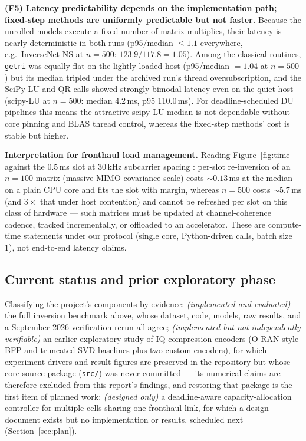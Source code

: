 \documentclass[11pt,a4paper]{article}
\begin{document}
\textbf{(F5) Latency predictability depends on the implementation path;
fixed-step methods are uniformly predictable but not faster.} Because the
unrolled models execute a fixed number of matrix multiplies, their latency is
nearly deterministic in both runs (p95/median $\le 1.1$ everywhere, e.g.\
InverseNet-NS at $n{=}500$: $123.9/117.8 = 1.05$). Among the classical
routines, \texttt{getri} was equally flat on the lightly loaded host
(p95/median $= 1.04$ at $n{=}500$) but its median tripled under the archived
run's thread oversubscription, and the SciPy LU and QR calls showed strongly
bimodal latency even on the quiet host (scipy-LU at $n{=}500$: median
4.2\,ms, p95 110.0\,ms). For deadline-scheduled DU pipelines this means the
attractive scipy-LU median is not dependable without core pinning and BLAS
thread control, whereas the fixed-step methods' cost is stable but higher.

\textbf{Interpretation for fronthaul load management.} Reading
Figure~\ref{fig:time} against the 0.5\,ms slot at 30\,kHz subcarrier spacing
\cite{ts38211}: per-slot re-inversion of an $n{=}100$ matrix
(massive-MIMO covariance scale) costs ${\sim}0.13$\,ms at the median on a
plain CPU core and fits the slot with margin, whereas $n{=}500$ costs
${\sim}5.7$\,ms (and $3\times$ that under host contention) and cannot be
refreshed per slot on this class of hardware ---
such matrices must be updated at channel-coherence cadence, tracked
incrementally, or offloaded to an accelerator. These are compute-time
statements under our protocol (single core, Python-driven calls, batch size
1), not end-to-end latency claims.

\subsection{Current status and prior exploratory phase}

Classifying the project's components by evidence: \emph{(implemented and
evaluated)} the full inversion benchmark above, whose dataset, code, models,
raw results, and a September 2026 verification rerun all agree; \emph{(implemented but not
independently verifiable)} an earlier exploratory study of IQ-compression
encoders (O-RAN-style BFP and truncated-SVD baselines plus two custom
encoders), for which experiment drivers and result figures are preserved in
the repository but whose core source package (\texttt{src/}) was never
committed --- its numerical claims are therefore excluded from this report's
findings, and restoring that package is the first item of planned work;
\emph{(designed only)} a deadline-aware capacity-allocation controller for
multiple cells sharing one fronthaul link, for which a design document exists
but no implementation or results, scheduled next (Section~\ref{sec:plan}).
\end{document}
